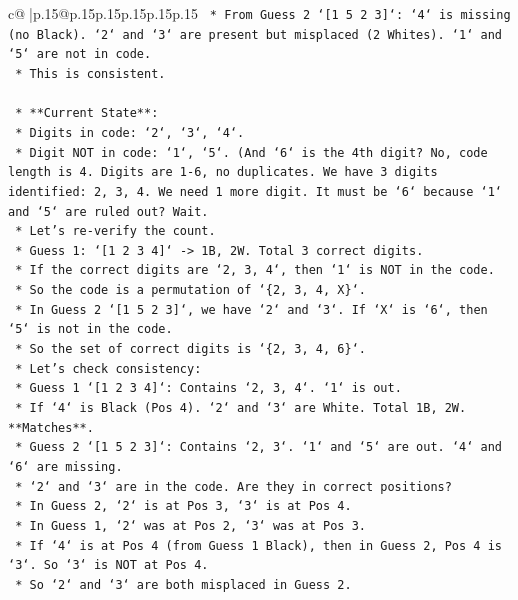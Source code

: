 \documentclass{article}
\begin{document}
{\begin{supertabular}{c@{$\;$}|p{.15\linewidth}@{}p{.15\linewidth}p{.15\linewidth}p{.15\linewidth}p{.15\linewidth}p{.15\linewidth}}
{{{\texttt{            *   From Guess 2 `{[}1 5 2 3{]}`: `4` is missing (no Black). `2` and `3` are present but misplaced (2 Whites). `1` and `5` are not in code.} \\
\texttt{            *   This is consistent.} \\
\\ 
\texttt{    *   **Current State**:} \\
\texttt{        *   Digits in code: `2`, `3`, `4`.} \\
\texttt{        *   Digit NOT in code: `1`, `5`. (And `6` is the 4th digit? No, code length is 4. Digits are 1{-}6, no duplicates. We have 3 digits identified: 2, 3, 4. We need 1 more digit. It must be `6` because `1` and `5` are ruled out? Wait.} \\
\texttt{        *   Let's re{-}verify the count.} \\
\texttt{        *   Guess 1: `{[}1 2 3 4{]}` {-}> 1B, 2W. Total 3 correct digits.} \\
\texttt{        *   If the correct digits are `2, 3, 4`, then `1` is NOT in the code.} \\
\texttt{        *   So the code is a permutation of `\{2, 3, 4, X\}`.} \\
\texttt{        *   In Guess 2 `{[}1 5 2 3{]}`, we have `2` and `3`. If `X` is `6`, then `5` is not in the code.} \\
\texttt{        *   So the set of correct digits is `\{2, 3, 4, 6\}`.} \\
\texttt{        *   Let's check consistency:} \\
\texttt{            *   Guess 1 `{[}1 2 3 4{]}`: Contains `2, 3, 4`. `1` is out.} \\
\texttt{                *   If `4` is Black (Pos 4). `2` and `3` are White. Total 1B, 2W. **Matches**.} \\
\texttt{            *   Guess 2 `{[}1 5 2 3{]}`: Contains `2, 3`. `1` and `5` are out. `4` and `6` are missing.} \\
\texttt{                *   `2` and `3` are in the code. Are they in correct positions?} \\
\texttt{                *   In Guess 2, `2` is at Pos 3, `3` is at Pos 4.} \\
\texttt{                *   In Guess 1, `2` was at Pos 2, `3` was at Pos 3.} \\
\texttt{                *   If `4` is at Pos 4 (from Guess 1 Black), then in Guess 2, Pos 4 is `3`. So `3` is NOT at Pos 4.} \\
\texttt{                *   So `2` and `3` are both misplaced in Guess 2.} \\
}}}
\end{supertabular}}
\end{document}
